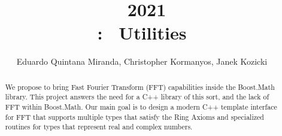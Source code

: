 \documentclass[11pt,a4paper]{article}
\title{\gsoc\ 2021\\\boostmath: \fft\ Utilities}
\author{Eduardo Quintana Miranda, Christopher Kormanyos, Janek Kozicki}
\begin{document}
\maketitle
\begin{abstract}
We propose to bring Fast Fourier Transform (FFT) capabilities
inside the Boost.Math library. This project answers the need for a C++ library
of this sort, and the lack of FFT within Boost.Math.
Our main goal is to design a modern C++ template interface for FFT
that supports multiple types that satisfy the Ring Axioms and specialized
routines for types that represent real and complex numbers.
\end{abstract}

\tableofcontents







    


\appendix

\end{document}
